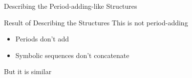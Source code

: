 \begin{frame}{Describing the Period-adding-like Structures}
	\vspace{-1em}
	\begin{figure}
	\end{figure}
\end{frame}

\begin{frame}{Result of Describing the Structures}
	This is not period-adding
	\begin{itemize}
		\item Periods don't add
		\item Symbolic sequences don't concatenate
	\end{itemize}
	\vspace{1em}
	But it is similar
\end{frame}
